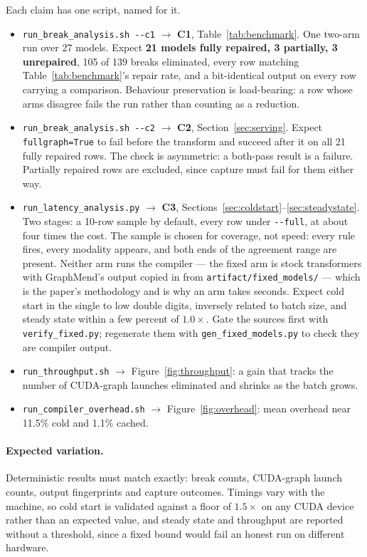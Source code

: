 Each claim has one script, named for it.

{\small
\begin{itemize}\itemsep0pt
  \item \texttt{run\_break\_analysis.sh -{}-c1} $\rightarrow$ \textbf{C1},
    Table~\ref{tab:benchmark}. One two-arm run over 27 models. Expect
    \textbf{21 models fully repaired, 3 partially, 3 unrepaired}, 105 of 139
    breaks eliminated, every row matching Table~\ref{tab:benchmark}'s repair
    rate, and a bit-identical output on every row carrying a comparison.
    Behaviour preservation is load-bearing: a row whose arms disagree fails the
    run rather than counting as a reduction.
  \item \texttt{run\_break\_analysis.sh -{}-c2} $\rightarrow$ \textbf{C2},
    Section~\ref{sec:serving}. Expect \texttt{fullgraph=True} to fail before
    the transform and succeed after it on all 21 fully repaired rows. The check
    is asymmetric: a both-pass result is a failure. Partially repaired rows are
    excluded, since capture must fail for them either way.
  \item \texttt{run\_latency\_analysis.py} $\rightarrow$ \textbf{C3},
    Sections~\ref{sec:coldstart}--\ref{sec:steadystate}. Two stages: a 10-row
    sample by default, every row under \texttt{-{}-full}, at about four times
    the cost. The sample is chosen for coverage, not speed: every rule fires,
    every modality appears, and both ends of the agreement range are present.
    Neither arm runs the compiler --- the fixed arm is stock transformers with
    GraphMend's output copied in from \texttt{artifact/fixed\_models/} --- which
    is the paper's methodology and is why an arm takes seconds. Expect cold
    start in the single to low double digits, inversely related to batch size,
    and steady state within a few percent of $1.0\times$. Gate the sources
    first with \texttt{verify\_fixed.py}; regenerate them with
    \texttt{gen\_fixed\_models.py} to check they are compiler output.
  \item \texttt{run\_throughput.sh} $\rightarrow$
    Figure~\ref{fig:throughput}: a gain that tracks the number of CUDA-graph
    launches eliminated and shrinks as the batch grows.
  \item \texttt{run\_compiler\_overhead.sh} $\rightarrow$
    Figure~\ref{fig:overhead}: mean overhead near 11.5\% cold and 1.1\% cached.
\end{itemize}
}

\paragraph{Expected variation.} Deterministic results must match exactly:
break counts, CUDA-graph launch counts, output fingerprints and capture
outcomes. Timings vary with the machine, so cold start is validated against a
floor of $1.5\times$ on any CUDA device rather than an expected value, and
steady state and throughput are reported without a threshold, since a fixed
bound would fail an honest run on different hardware.

